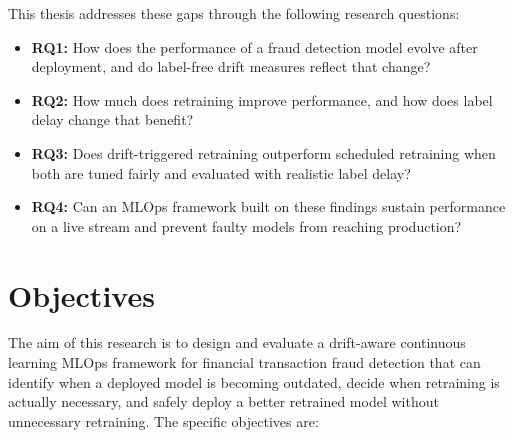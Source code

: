 This thesis addresses these gaps through the following research questions:

\begin{itemize}[label={}, leftmargin=2em]
  \item \textbf{RQ1:} How does the performance of a fraud detection model evolve after deployment, and do label-free drift measures reflect that change?
  \item \textbf{RQ2:} How much does retraining improve performance, and how does label delay change that benefit?
  \item \textbf{RQ3:} Does drift-triggered retraining outperform scheduled retraining when both are tuned fairly and evaluated with realistic label delay?
  \item \textbf{RQ4:} Can an MLOps framework built on these findings sustain performance on a live stream and prevent faulty models from reaching production?
\end{itemize}

\section{Objectives}

The aim of this research is to design and evaluate a drift-aware continuous learning MLOps framework for financial transaction fraud detection that can identify when a deployed model is becoming outdated, decide when retraining is actually necessary, and safely deploy a better retrained model without unnecessary retraining. The specific objectives are:

